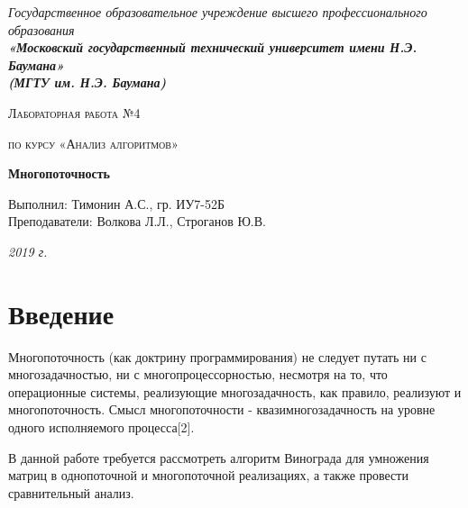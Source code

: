 \documentclass[12pt, a4paper]{report}
\begin{document}
    \begin{titlepage}

        \begin{center}
            \Large
            {\sl Государственное образовательное учреждение высшего профессионального образования\\
            {\bf«Московский государственный технический университет имени Н.Э. Баумана»\\
				(МГТУ им. Н.Э. Баумана)}}
            \vspace{3cm}

			{\scshape\LARGE Лабораторная работа №4 \par}
			\vspace{0.5cm}	
			{\scshape\LARGE по курсу «Анализ алгоритмов» \par}
			\vspace{1.5cm}
			{\huge\bfseries Многопоточность \par}
			\vspace{2cm}
			\Large Выполнил: Тимонин А.С., гр. ИУ7-52Б\\
			\vspace{0.5cm}
			{\Large Преподаватели: Волкова Л.Л., Строганов Ю.В.}
		
			\vfill
			\Large \textit {2019 г.}
            
        \end{center}

    \end{titlepage}
	
	\tableofcontents

	\chapter*{Введение}
	
	\vspace{-0.5cm}\hspace{0.6cm}Многопоточность (как доктрину программирования) не следует путать ни с многозадачностью, ни с многопроцессорностью, несмотря на то, что операционные системы, реализующие многозадачность, как правило, реализуют и многопоточность. Смысл многопоточности - квазимногозадачность на уровне одного исполняемого процесса[2].
		
	\vspace{0.3cm}В данной работе требуется рассмотреть алгоритм Винограда для умножения матриц в однопоточной и многопоточной реализациях, а также провести сравнительный анализ.
	
\end{document}
